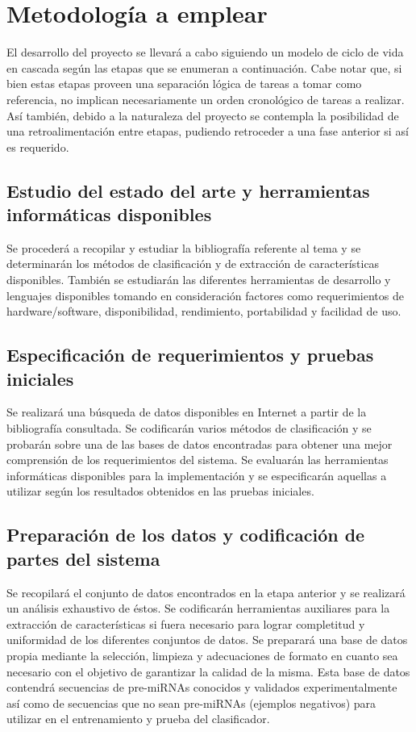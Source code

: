 \documentclass[12pt,bibliography=oldstyle,DIV=12,parskip=full-,titlepage]{scrartcl}
\begin{document}
\section{Metodología a emplear}
El desarrollo del proyecto se llevará a cabo siguiendo un modelo de
ciclo de vida en cascada según las etapas que se enumeran a
continuación.  Cabe notar que, si bien estas etapas proveen una
separación lógica de tareas a tomar como referencia, no implican
necesariamente un orden cronológico de tareas a realizar. Así también,
debido a la naturaleza del proyecto se contempla la posibilidad de una
retroalimentación entre etapas, pudiendo retroceder a una fase
anterior si así es requerido.
%
\subsection{Estudio del estado del arte y herramientas informáticas
  disponibles}
Se procederá a recopilar y estudiar la bibliografía referente al tema
y se determinarán los métodos de clasificación y de extracción de
características disponibles. También se estudiarán las diferentes
herramientas de desarrollo y lenguajes disponibles tomando en
consideración factores como requerimientos de hardware/software,
disponibilidad, rendimiento, portabilidad y facilidad de uso.
%
\subsection{Especificación de requerimientos y pruebas iniciales}
Se realizará una búsqueda de datos disponibles en Internet a partir de
la bibliografía consultada.  Se codificarán varios métodos de
clasificación y se probarán sobre una de las bases de datos
encontradas para obtener una mejor comprensión de los requerimientos
del sistema.
%
Se evaluarán las herramientas informáticas disponibles para la
implementación y se especificarán aquellas a utilizar según los
resultados obtenidos en las pruebas iniciales.
%
\subsection{Preparación de los datos y codificación de partes del sistema}
Se recopilará el conjunto de datos encontrados en la etapa anterior y
se realizará un análisis exhaustivo de éstos.  Se codificarán
herramientas auxiliares para la extracción de características si fuera
necesario para lograr completitud y uniformidad de los diferentes
conjuntos de datos.  Se preparará una base de datos propia mediante la
selección, limpieza y adecuaciones de formato en cuanto sea necesario
con el objetivo de garantizar la calidad de la misma. Esta base de
datos contendrá secuencias de pre-miRNAs conocidos y validados
experimentalmente así como de secuencias que no sean pre-miRNAs
(ejemplos negativos) para utilizar en el entrenamiento y prueba del
clasificador.
\end{document}
